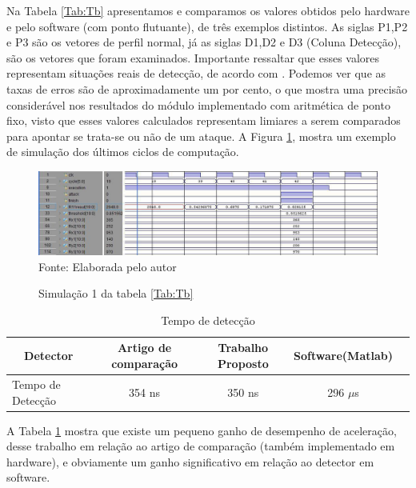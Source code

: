 Na Tabela \ref{Tab:Tb} apresentamos e comparamos os valores obtidos pelo hardware e pelo software (com ponto flutuante), de  três exemplos distintos. As siglas P1,P2 e P3 são os vetores de perfil normal, já as siglas D1,D2 e D3 (Coluna Detecção), são os vetores que foram examinados. Importante ressaltar que esses valores representam situações reais de detecção, de acordo com  . Podemos ver que as taxas de erros são de aproximadamente um por cento, o que mostra uma precisão considerável nos resultados do módulo implementado com aritmética de ponto fixo, visto que esses valores calculados representam limiares a serem comparados para apontar se trata-se ou não de um ataque. A Figura \ref{simu}, mostra um exemplo de simulação dos últimos ciclos de computação. 

\begin{figure}[H]
	\centering
	\caption{Simulação 1 da tabela  \ref{Tab:Tb}}
	\includegraphics[width=14cm]{figures/simu.jpg}\\
	
	{Fonte: Elaborada pelo autor}
	
	\label{simu}
\end{figure}



\begin{table}[H]
	\centering
	\caption{Tempo de detecção}
	\label{Tab:TD}
	\begin{tabular}{lcccc}
		\hline
		\multicolumn{1}{c}{Detector}&\multicolumn{1}{c}{Artigo de comparação }&\multicolumn{1}{c}{Trabalho Proposto}&\multicolumn{1}{c}{Software(Matlab)}
		\\ \midrule
		
		Tempo de Detecção &  354 ns  &  350 ns & 296 $\mu$s  \\   \midrule
		
	\end{tabular}
\end{table}

A Tabela \ref{Tab:TD} mostra que existe um pequeno ganho de desempenho de aceleração, desse trabalho em relação ao artigo de comparação (também implementado em hardware), e obviamente um ganho significativo em relação ao detector em software.

 